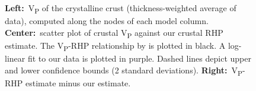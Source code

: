 \begin{subappendices}
\begin{figure}
	\begin{adjustbox}{center}
	\end{adjustbox}
	\caption[Relationship of RHP with V\textsubscript{P}, difference with fitted RHP.]{
		\textbf{Left:}~V\textsubscript{P} of the crystalline crust (thickness-weighted average of \cite{Pasyanos2014} data), computed along the nodes of each model column.
		\textbf{Center:}~scatter plot of crustal V\textsubscript{P} against our crustal RHP estimate. The V\textsubscript{P}-RHP relationship by \cite{Hasterok2017_ign} is plotted in black. A log-linear fit to our data is plotted in purple. Dashed lines depict upper and lower confidence bounds (2 standard deviations).
		\textbf{Right:}~V\textsubscript{P}-RHP estimate minus our estimate.}
	\label{fig:VpRHP}
\end{figure}

\end{subappendices}
